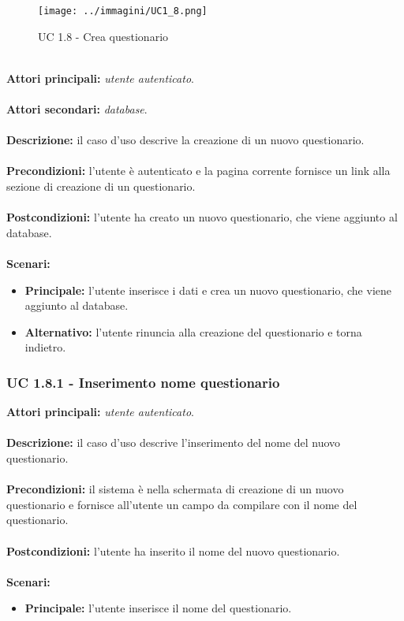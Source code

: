 \documentclass[a4paper,11pt]{article}
\begin{document}
\begin{figure}[h!]
\centering
\texttt{[image: ../immagini/UC1\_8.png]}
\caption{UC 1.8 - Crea questionario}
\end{figure}
\ \\
\textbf{Attori principali:} \textit{utente autenticato}.\\
\\
\textbf{Attori secondari:} \textit{database}.\\
\\
\textbf{Descrizione:} il caso d'uso descrive la creazione di un nuovo questionario. \\
\\
\textbf{Precondizioni:} l'utente è autenticato e la pagina corrente fornisce un link alla sezione di creazione di un questionario.\\
\\
\textbf{Postcondizioni:} l'utente ha creato un nuovo questionario, che viene aggiunto al database. \\
\\
\textbf{Scenari:}
\begin{itemize}
\item \textbf{Principale:} l'utente inserisce i dati e crea un nuovo questionario, che viene aggiunto al database.
\item \textbf{Alternativo:} l'utente rinuncia alla creazione del questionario e torna indietro.\\ 
\end{itemize}
\vspace{6 mm}
\subsubsection{UC 1.8.1 - Inserimento nome questionario}

\textbf{Attori principali:} \textit{utente autenticato}.\\
\\
\textbf{Descrizione:} il caso d'uso descrive l'inserimento del nome del nuovo questionario. \\
\\
\textbf{Precondizioni:} il sistema è nella schermata di creazione di un nuovo questionario e fornisce all'utente un campo da compilare con il nome del questionario.\\
\\
\textbf{Postcondizioni:} l'utente ha inserito il nome del nuovo questionario. \\
\\
\textbf{Scenari:}
\begin{itemize}
\item \textbf{Principale:} l'utente inserisce il nome del questionario.
\end{itemize}
\vspace{6 mm}
\end{document}
